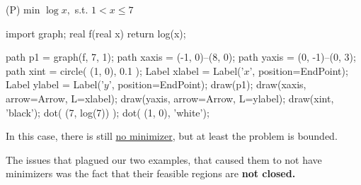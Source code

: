 \documentclass{article}
\begin{document}
\begin{example}
	(P) min $\log x,$ s.t. $1<x\le7$
	\begin{center}
		\begin{asy}
			import graph;
			real f(real x) {
				return log(x);
			}

			path p1 = graph(f, 7, 1);
			path xaxis = (-1, 0)--(8, 0);
			path yaxis = (0, -1)--(0, 3);
			path xint = circle( (1, 0), 0.1 );
			Label xlabel = Label('$x$', position=EndPoint);
			Label ylabel = Label('$y$', position=EndPoint);
			draw(p1);
			draw(xaxis, arrow=Arrow, L=xlabel);
			draw(yaxis, arrow=Arrow, L=ylabel);
			draw(xint, 'black');
			dot( (7, log(7))  );
			dot( (1, 0), 'white');
		\end{asy}
	\end{center}
	In this case, there is still \ul{no minimizer}, but at least the problem is bounded.
\end{example}

The issues that plagued our two examples, that caused them to not have minimizers was the fact that their feasible regions are \bf{not closed}. 
\end{document}

